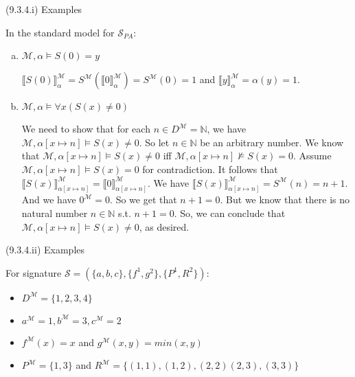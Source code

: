 \begin{frame}{(9.3.4.i) Examples}

In the standard model for $\mathcal{S}_{PA}$:

\begin{enumerate}[(a)]
\itemsep=16pt
			
				\item $\mathcal{M},\alpha\vDash S(0)=y$
				
				$\llbracket S(0)\rrbracket^\mathcal{M}_\alpha=S^\mathcal{M}(\llbracket 0\rrbracket^\mathcal{M}_\alpha)=S^\mathcal{M}(0)=1$ and $\llbracket y\rrbracket^\mathcal{M}_\alpha=\alpha(y)=1$.
				
				\setcounter{enumi}{5}
				
				\item $\mathcal{M},\alpha\vDash\forall x(S(x)\neq 0)$

				{We need to show that for each  $n\in D^\mathcal{M}=\mathbb{N}$, we have $\mathcal{M},\alpha[x\mapsto n]\vDash S(x)\neq 0$. So let $n\in \mathbb{N}$ be an arbitrary number. We know that  $\mathcal{M},\alpha[x\mapsto n]\vDash S(x)\neq 0$ iff $\mathcal{M},\alpha[x\mapsto n]\nvDash S(x)=0$. Assume $\mathcal{M},\alpha[x\mapsto n]\vDash S(x)=0$ for contradiction. It follows that $\llbracket S(x)\rrbracket^\mathcal{M}_{\alpha[x\mapsto n]}=\llbracket0\rrbracket^\mathcal{M}_{\alpha[x\mapsto n]}$. We have $\llbracket S(x)\rrbracket^\mathcal{M}_{\alpha[x\mapsto n]}=S^\mathcal{M}(n)=n+1$. And we have $0^\mathcal{M}=0$. So we get that $n+1=0$. But we know that there is no natural number $n\in\mathbb{N}$ s.t. $n+1=0$. So, we can conclude that $\mathcal{M},\alpha[x\mapsto n]\vDash S(x)\neq 0$, as desired.}
				
				\end{enumerate}
				
				\end{frame}

\begin{frame}{(9.3.4.ii) Examples}

For signature $\mathcal{S}=(\{a,b,c\}, \{f^1, g^2\}, \{P^1, R^2\})$:
							
						
						\begin{itemize}
						
							\item $D^\mathcal{M}=\{1,2,3,4\}$
							
							\item $a^\mathcal{M}=1, b^\mathcal{M}=3, c^\mathcal{M}=2$
						
							\item $f^\mathcal{M}(x)=x$ and $g^\mathcal{M}(x,y)=min(x,y)$
							
							\item $P^\mathcal{M}=\{1,3\}$ and $R^\mathcal{M}=\{(1,1), (1,2),(2,2) (2,3), (3,3)\}$
						
						\end{itemize}
						
						

\end{frame}

